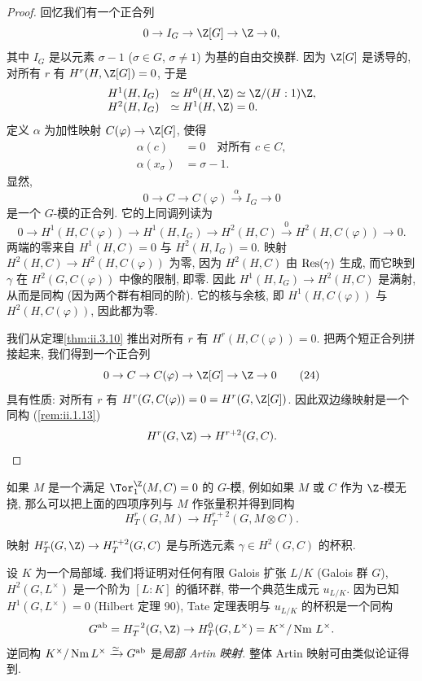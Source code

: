 \begin{proof}
回忆我们有一个正合列
\[
 0\to I_G\to \Z[G]\to\Z\to 0,
\]
其中 $I_G$ 是以元素 $\sigma-1$ ($\sigma\in G$, $\sigma\neq 1$) 为基的自由交换群. 因为 $\Z[G]$ 是诱导的, 对所有 $r$ 有 $H^r(H,\Z[G])=0$, 于是
\[
 \begin{array}{r l}
 H^1(H,I_G) & \simeq H^0(H,\Z)\simeq \Z/(H:1)\Z,\\
 H^2(H,I_G) & \simeq H^1(H,\Z)=0.
 \end{array}
\]
定义 $\alpha$ 为加性映射 $C(\varphi)\to \Z[G]$, 使得
\[
 \begin{aligned}
 \alpha(c)&=0\quad\text{对所有 }c\in C,\\
 \alpha(x_\sigma)&=\sigma-1.
 \end{aligned}
\]
显然,
\[
 0\to C\to C(\varphi)\xrightarrow{\alpha} I_G\to 0
\]
是一个 $G$-模的正合列. 它的上同调列读为
\[
 0\to H^1(H,C(\varphi))\to H^1(H,I_G)\to H^2(H,C)\xrightarrow{0} H^2(H,C(\varphi))\to 0.
\]
两端的零来自 $H^1(H,C)=0$ 与 $H^2(H,I_G)=0$. 映射 $H^2(H,C)\to H^2(H,C(\varphi))$ 为零, 因为 $H^2(H,C)$ 由 $\operatorname{Res}(\gamma)$ 生成, 而它映到 $\gamma$ 在 $H^2(G,C(\varphi))$ 中像的限制, 即零. 因此 $H^1(H,I_G)\to H^2(H,C)$ 是满射, 从而是同构 (因为两个群有相同的阶). 它的核与余核, 即 $H^1(H,C(\varphi))$ 与 $H^2(H,C(\varphi))$, 因此都为零.

我们从定理\ref{thm:ii.3.10} 推出对所有 $r$ 有 $H^r(H,C(\varphi))=0$. 把两个短正合列拼接起来, 我们得到一个正合列
\begin{equation*}
 0\to C\to C(\varphi)\to \Z[G]\to\Z\to 0
\tag{24}
\end{equation*}
具有性质: 对所有 $r$ 有 $H^r(G,C(\varphi))=0=H^r(G,\Z[G])$. 因此双边缘映射是一个同构 (\ref{rem:ii.1.13})
\[
 H^r(G,\Z)\to H^{r+2}(G,C).
\]
\end{proof}

\begin{remark}\label{rem:ii.3.12}
如果 $M$ 是一个满足 $\Tor_1^\Z(M,C)=0$ 的 $G$-模, 例如如果 $M$ 或 $C$ 作为 $\Z$-模无挠, 那么可以把上面的四项序列与 $M$ 作张量积并得到同构
\[
 H_T^r(G,M)\to H_T^{r+2}(G,M\otimes C).
\]
\end{remark}

\begin{remark}\label{rem:ii.3.13}
映射 $H_T^r(G,\Z)\to H_T^{r+2}(G,C)$ 是与所选元素 $\gamma\in H^2(G,C)$ 的杯积.
\end{remark}

\begin{example}\label{ex:ii.3.14}
设 $K$ 为一个局部域. 我们将证明对任何有限 Galois 扩张 $L/K$ (Galois 群 $G$), $H^2(G,L^\times)$ 是一个阶为 $[L:K]$ 的循环群, 带一个典范生成元 $u_{L/K}$. 因为已知 $H^1(G,L^\times)=0$ (Hilbert 定理 90), Tate 定理表明与 $u_{L/K}$ 的杯积是一个同构
\[
 G^{\mathrm{ab}}=H_T^{-2}(G,\Z)\to H_T^0(G,L^\times)=K^\times/\Nm\, L^\times.
\]
逆同构 $K^\times/\operatorname{Nm} L^\times\xrightarrow{\simeq} G^{\mathrm{ab}}$ 是\emph{局部 Artin 映射}. 整体 Artin 映射可由类似论证得到.
\end{example}

